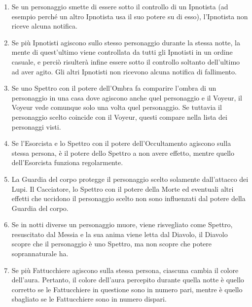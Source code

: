 \documentclass[a4paper,10pt]{article}
\begin{document}
\begin{enumerate}
 \item Se un personaggio smette di essere sotto il controllo di un Ipnotista (ad
esempio perché un altro Ipnotista usa il suo potere su di esso), l'Ipnotista non
riceve alcuna notifica.
 
 \item Se più Ipnotisti agiscono sullo stesso personaggio durante la stessa
notte, la mente di quest'ultimo viene controllata da tutti gli Ipnotisti in un
ordine casuale, e perciò risulterà infine essere sotto il controllo soltanto
dell'ultimo ad aver agito. Gli altri Ipnotisti non ricevono alcuna notifica di
fallimento.
 
 \item Se uno Spettro con il potere dell'Ombra fa comparire l'ombra di un
personaggio in una casa dove agiscono anche quel personaggio e il Voyeur, il
Voyeur vede comunque solo una volta quel personaggio. Se tuttavia il personaggio
scelto coincide con il Voyeur, questi compare nella lista dei personaggi visti.

 \item Se l'Esorcista e lo Spettro con il potere dell'Occultamento agiscono
sulla stessa persona, è il potere dello Spettro a non avere effetto, mentre
quello dell'Esorcista funziona regolarmente.
 
 \item La Guardia del corpo protegge il personaggio scelto solamente
dall'attacco dei Lupi. Il Cacciatore, lo Spettro con il potere della Morte ed
eventuali altri effetti che uccidono il personaggio scelto non sono influenzati
dal potere della Guardia del corpo.
 
 \item Se in notti diverse un personaggio muore, viene risvegliato come Spettro,
resuscitato dal Messia e la sua anima viene letta dal Diavolo, il Diavolo scopre
che il personaggio è uno Spettro, ma non scopre che potere soprannaturale ha.
 
 \item Se più Fattucchiere agiscono sulla stessa persona, ciascuna cambia il
colore dell'aura. Pertanto, il colore dell'aura percepito durante quella notte è
quello corretto se le Fattucchiere in questione sono in numero pari, mentre è
quello sbagliato se le Fattucchiere sono in numero dispari.
 

\end{enumerate}
\end{document}
